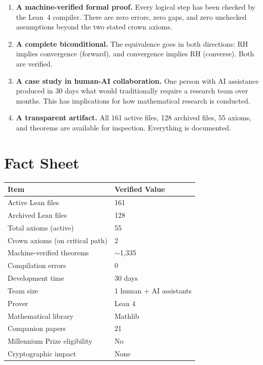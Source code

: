 \documentclass[11pt,a4paper]{article}
\begin{document}
\begin{enumerate}
  \item \textcolor{correct}{\textbf{A machine-verified formal
    proof.}} Every logical step has been checked by the Lean~4
    compiler. There are zero errors, zero gaps, and zero
    unchecked assumptions beyond the two stated crown axioms.

  \item \textcolor{correct}{\textbf{A complete biconditional.}}
    The equivalence goes in both directions: RH implies convergence
    (forward), and convergence implies RH (converse). Both are
    verified.

  \item \textcolor{correct}{\textbf{A case study in human-AI
    collaboration.}} One person with AI assistance produced in
    30 days what would traditionally require a research team over
    months. This has implications for how mathematical research
    is conducted.

  \item \textcolor{correct}{\textbf{A transparent artifact.}}
    All 161 active files, 128 archived files, 55 axioms, and
    theorems are available for inspection. Everything is
    documented.
\end{enumerate}

\section{Fact Sheet}

\begin{center}
\begin{tabular}{@{}ll@{}}
\toprule
\textbf{Item} & \textbf{Verified Value} \\
\midrule
Active Lean files & 161 \\
Archived Lean files & 128 \\
Total axioms (active) & 55 \\
Crown axioms (on critical path) & 2 \\
Machine-verified theorems & $\sim$1,335 \\
Compilation errors & 0 \\
Development time & 30 days \\
Team size & 1 human + AI assistants \\
Prover & Lean 4 \\
Mathematical library & Mathlib \\
Companion papers & 21 \\
Millennium Prize eligibility & No \\
Cryptographic impact & None \\
\bottomrule
\end{tabular}
\end{center}
\end{document}
